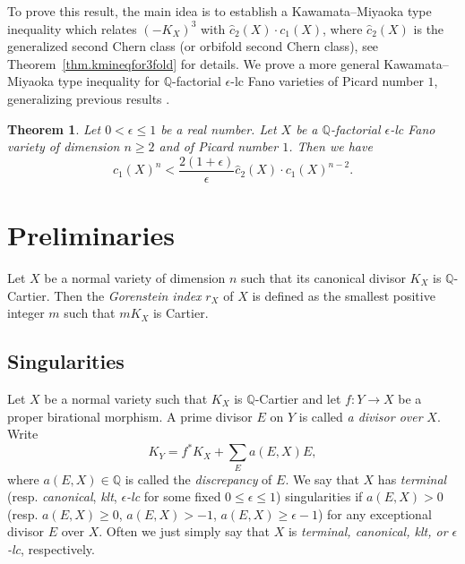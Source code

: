 \documentclass[12pt,twoside]{amsart}
\newtheorem{thm}{Theorem}[section]
\theoremstyle{definition}
\newtheorem{defn}[thm]{Definition}
\begin{document}
To prove this result, the main idea is to establish a Kawamata--Miyaoka type inequality which relates $(-K_X)^3$ with $\hat{c}_2(X)\cdot c_1(X)$, where $\hat{c}_2(X)$ is the generalized second Chern class (or orbifold second Chern class), see Theorem~\ref{thm.kmineqfor3fold} for details. We prove a more general Kawamata--Miyaoka type inequality for $\mathbb Q$-factorial $\epsilon$-lc Fano varieties of Picard number $1$, generalizing previous results \cites{Liu2019a,LiuLiu2023, LiuLiu2024}.

\begin{thm}\label{thm.KMinqEpsilonLC}
Let $0< \epsilon\leq 1$ be a real number. Let $X$ be a $\mathbb Q$-factorial $\epsilon$-lc Fano variety of dimension $n\geq 2$ and of Picard number $1$. Then we have
 \[
 c_1(X)^{n}<\frac{2(1+\epsilon)}{\epsilon} \hat{c}_2(X)\cdot c_1(X)^{n-2}.
 \]
\end{thm}

	

\section{Preliminaries}
Let $X$ be a normal variety of dimension $n$ such that its canonical divisor $K_X$ is $\mathbb Q$-Cartier. Then the \emph{Gorenstein index} $r_X$ of $X$ is defined as the smallest positive integer $m$ such that $mK_X$ is Cartier.
 
\subsection{Singularities}
Let $X$ be a normal variety such that $K_X$ is $\mathbb Q$-Cartier and let $f\colon Y\to X$ be a proper birational morphism. A prime divisor $E$ on $Y$ is called \emph{a divisor over} $X$. %
Write
\[
 K_Y=f^*K_X+\sum_Ea(E,X)E,
\]
where $a(E,X)\in \mathbb Q$ is called the \emph{discrepancy} of $E$. We say that $X$ has \emph{terminal} (resp. \emph{canonical}, \emph{klt}, \emph{$\epsilon$-lc} for some fixed $0\leq \epsilon\leq 1$) singularities if $a(E,X)>0$ (resp. $a(E,X)\geq 0$, $a(E,X)>-1$, $a(E,X)\geq \epsilon-1$) for any exceptional divisor $E$ over $X$.
Often we just simply say that $X$ is 
{\it terminal, canonical, klt, or $\epsilon$-lc}, respectively.

\end{document}
